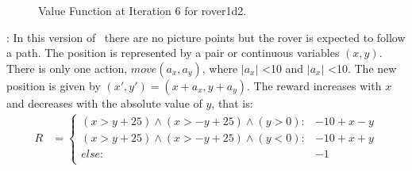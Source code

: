 \begin{figure}[h!t]
\center
{}
\caption{Value Function at Iteration 6 for rover1d2.}
\label{steplin} 
\end{figure}

\MarsRoverBi: In this version of \MarsRover ~there are no picture points but the rover is expected to follow a path. The position is represented by a pair or continuous variables $(x,y)$. There is only one action, $move(a_x,a_y)$, where $|a_x|$ <10 and $|a_x|$ <10. The new position is given by $(x',y') = ( x+a_x, y+a_y)$. The reward increases with $x$ and decreases with the absolute value of $y$, that is:
{\scriptsize
\begin{align*}
R & = \begin{cases}
(x > y +25) \wedge (x > - y  +25) \wedge (y >0): &-10 + x -y\\
(x > y +25) \wedge (x > - y  +25) \wedge (y <0): & -10 + x +y\\
else: & -1\\
\end{cases}
\end{align*}}


